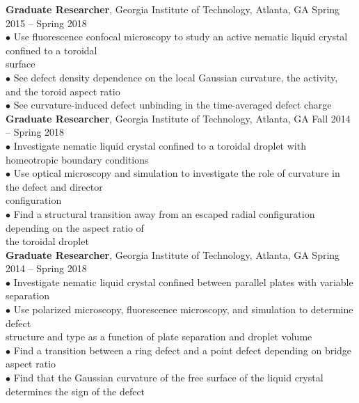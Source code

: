 \documentclass[10pt]{article}
\begin{document}
{\bf Graduate Researcher}, Georgia Institute of Technology, Atlanta, GA \hfill Spring 2015 -- Spring 2018\\
\hspace*{10pt}$\bullet$ Use fluorescence confocal microscopy to study an active nematic liquid crystal confined to a toroidal\\ \hspace*{15pt} surface\\
\hspace*{10pt}$\bullet$ See defect density dependence on the local Gaussian curvature, the activity, and the toroid aspect ratio\\
\hspace*{10pt}$\bullet$ See curvature-induced defect unbinding in the time-averaged defect charge\\

{\bf Graduate Researcher}, Georgia Institute of Technology, Atlanta, GA \hfill Fall 2014 -- Spring 2018\\
\hspace*{10pt}$\bullet$ Investigate nematic liquid crystal confined to a toroidal droplet with homeotropic boundary conditions\\
\hspace*{10pt}$\bullet$ Use optical microscopy and simulation to investigate the role of curvature in the defect and director\\ \hspace*{15pt} configuration\\
\hspace*{10pt}$\bullet$ Find a structural transition away from an escaped radial configuration depending on the aspect ratio of\\ \hspace*{15pt} the toroidal droplet\\


{\bf Graduate Researcher}, Georgia Institute of Technology, Atlanta, GA \hfill Spring 2014 -- Spring 2018\\
\hspace*{10pt}$\bullet$ Investigate nematic liquid crystal confined between parallel plates with variable separation\\
\hspace*{10pt}$\bullet$ Use polarized microscopy, fluorescence microscopy, and simulation to determine defect \\ \hspace*{15pt} structure and type as a function of plate separation and droplet volume\\
\hspace*{10pt}$\bullet$ Find a transition between a ring defect and a point defect depending on bridge aspect ratio\\
\hspace*{10pt}$\bullet$ Find that the Gaussian curvature of the free surface of the liquid crystal determines the sign of the defect\\
\end{document}
